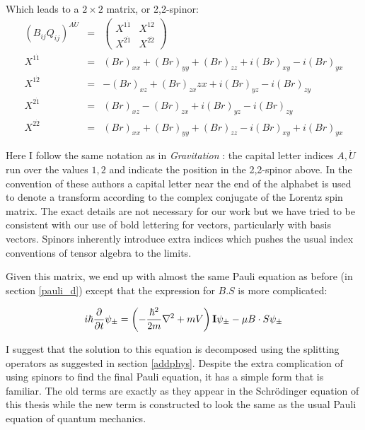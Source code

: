\noindent Which leads to a $2\times 2$ matrix, or 2,2-spinor:
\begin{eqnarray}
(B_{ij} Q_{ij})^{A\dot{U}} &=& 
\left(\begin{array}{cc}
X^{1\dot{1}} & X^{1\dot{2}} \\
X^{2\dot{1}} & X^{2\dot{2}}
\end{array}\right) \\
X^{1\dot{1}} &=& (B r)_{xx} +(B r)_{yy} + (B r)_{zz} + i (B r)_{xy} -i (B r)_{yx} \\
X^{1\dot{2}} &=& -(B r)_{xz} + (B r)_{zx}{zx} + i (B r)_{yz} - i (B r)_{zy} \\
X^{2\dot{1}} &=& (B r)_{xz} -(B r)_{zx} +i (B r)_{yz} - i (B r)_{zy} \\
X^{2\dot{2}} &=& (B r)_{xx} + (B r)_{yy} + (B r)_{zz} - i (B r)_{xy} +i (B r)_{yx}
\end{eqnarray}

\noindent Here I follow the same notation as in {\it Gravitation} \citep{bib_grav}: the capital letter indices $A, \dot{U}$ run over the values $1,2$ and indicate the position in the 2,2-spinor above. In the convention of these authors a capital letter near the end of the alphabet is used to denote a transform according to the complex conjugate of the Lorentz spin matrix. The exact details are not necessary for our work but we have tried to be consistent with our use of bold lettering for vectors, particularly with basis vectors. Spinors inherently introduce extra indices which pushes the usual index conventions of tensor algebra to the limits.

Given this matrix, we end up with almost the same Pauli equation as before (in section \ref{pauli_d}) except that the expression for $B.S$ is more complicated:

\begin{equation}
i\hbar\frac{\partial}{\partial t}\psi_\pm = \left( -\frac{\hbar^2}{2m} \nabla^2 + mV \right) {\bf I} \psi_\pm -\mu B\cdot S \psi_\pm
\end{equation}

\noindent I suggest that the solution to this equation is decomposed using the splitting operators as suggested in section \ref{addphys}. Despite the extra complication of using spinors to find the final Pauli equation, it has a simple form that is familiar. The old terms are exactly as they appear in the Schr\"odinger equation of this thesis while the new term is constructed to look the same as the usual Pauli equation of quantum mechanics.

